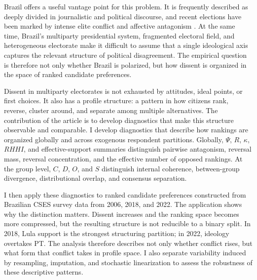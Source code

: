 \documentclass[12pt]{article}
\begin{document}
Brazil offers a useful vantage point for this problem. It is frequently described as deeply divided in journalistic and political discourse, and recent elections have been marked by intense elite conflict and affective antagonism \parencite{nunes2023biografia, samuels2018partisans, sen2007identity}. At the same time, Brazil's multiparty presidential system, fragmented electoral field, and heterogeneous electorate make it difficult to assume that a single ideological axis captures the relevant structure of political disagreement. The empirical question is therefore not only whether Brazil is polarized, but how dissent is organized in the space of ranked candidate preferences.

 Dissent in multiparty electorates is not exhausted by attitudes, ideal points, or first choices. It also has a profile structure: a pattern in how citizens rank, reverse, cluster around, and separate among multiple alternatives. The contribution of the article is to develop diagnostics that make this structure observable and comparable. I develop diagnostics that describe how rankings are organized globally and across exogenous respondent partitions. Globally, \(\Psi\), \(R\), \(\kappa\), \(RHHI\), and effective-support summaries distinguish pairwise antagonism, reversal mass, reversal concentration, and the effective number of opposed rankings. At the group level, \(C\), \(D\), \(O\), and \(S\) distinguish internal coherence, between-group divergence, distributional overlap, and consensus separation.

I then apply these diagnostics to ranked candidate preferences constructed from Brazilian CSES survey data from 2006, 2018, and 2022. The application shows why the distinction matters. Dissent increases and the ranking space becomes more compressed, but the resulting structure is not reducible to a binary split. In 2018, Lula support is the strongest structuring partition; in 2022, ideology overtakes PT. The analysis therefore describes not only whether conflict rises, but what form that conflict takes in profile space. I also separate variability induced by resampling, imputation, and stochastic linearization to assess the robustness of these descriptive patterns.
\end{document}
